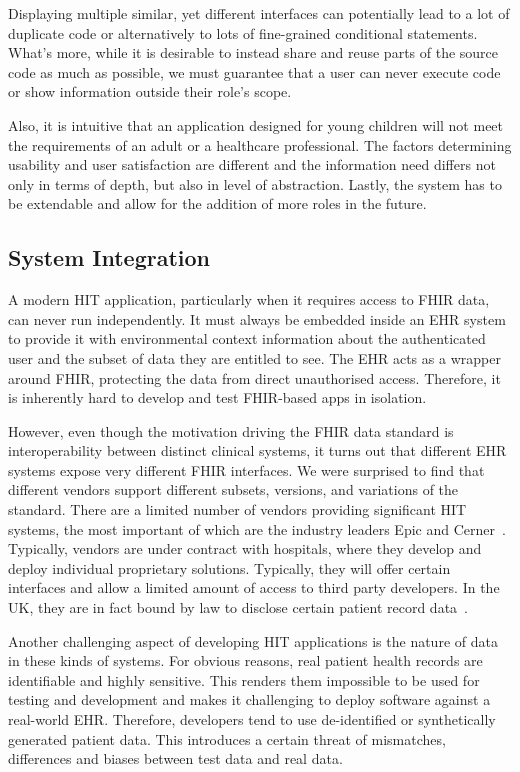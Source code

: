 \documentclass[sigconf]{acmart}
\begin{document}
Displaying multiple similar, yet different interfaces can potentially lead to a lot of duplicate code or alternatively to lots of fine-grained conditional statements. What's more, while it is desirable to instead share and reuse parts of the source code as much as possible, we must guarantee that a user can never execute code or show information outside their role's scope.

Also, it is intuitive that an application designed for young children will not meet the requirements of an adult or a healthcare professional. The factors determining usability and user satisfaction are different and the information need differs not only in terms of depth, but also in level of abstraction. Lastly, the system has to be extendable and allow for the addition of more roles in the future.


\subsection{System Integration}
\label{sec:challenge-integration}

A modern HIT application, particularly when it requires access to FHIR data, can never run independently. It must always be embedded inside an EHR system to provide it with environmental context information about the authenticated user and the subset of data they are entitled to see. The EHR acts as a wrapper around FHIR, protecting the data from direct unauthorised access. Therefore, it is inherently hard to develop and test FHIR-based apps in isolation.

However, even though the motivation driving the FHIR data standard is interoperability between distinct clinical systems, it turns out that different EHR systems expose very different FHIR interfaces. We were surprised to find that different vendors support  different subsets, versions, and variations of the standard. There are a limited number of vendors providing significant HIT systems, the most important of which are the industry leaders Epic and Cerner~\cite{klas-interoperability-2019}. Typically, vendors are under contract with hospitals, where they develop and deploy individual proprietary solutions. Typically, they will offer certain interfaces and allow a limited amount of access to third party developers. In the UK, they are in fact bound by law to disclose certain patient record data~\cite{nhs-interoperability}.%

Another challenging aspect of developing HIT applications is the nature of data in these kinds of systems. For obvious reasons, real patient health records are identifiable and highly sensitive. This renders them impossible to be used for testing and development and makes it challenging to deploy software against a real-world EHR. Therefore, developers tend to use de-identified or synthetically generated patient data. This introduces a certain threat of mismatches, differences and biases between test data and real data.
\end{document}
